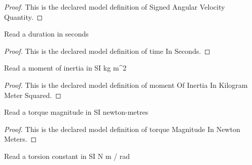 \begin{proof}
  This is the declared model definition of Signed Angular Velocity Quantity.
\end{proof}
\begin{definition}
  \label{def:physics:phyx-mini-0278:phyxminiproblems-problemphyxmini0278-timeinseconds}
  Read a duration in seconds
\end{definition}
\begin{proof}
  This is the declared model definition of time In Seconds.
\end{proof}
\begin{definition}
  \label{def:physics:phyx-mini-0278:phyxminiproblems-problemphyxmini0278-momentofinertiainkilogrammetersquared}
  Read a moment of inertia in SI kg m\textasciicircum{}2
\end{definition}
\begin{proof}
  This is the declared model definition of moment Of Inertia In Kilogram Meter Squared.
\end{proof}
\begin{definition}
  \label{def:physics:phyx-mini-0278:phyxminiproblems-problemphyxmini0278-torquemagnitudeinnewtonmeters}
  Read a torque magnitude in SI newton-metres
\end{definition}
\begin{proof}
  This is the declared model definition of torque Magnitude In Newton Meters.
\end{proof}
\begin{definition}
  \label{def:physics:phyx-mini-0278:phyxminiproblems-problemphyxmini0278-torsionconstantinnewtonmetersperradian}
  Read a torsion constant in SI N m / rad
\end{definition}

